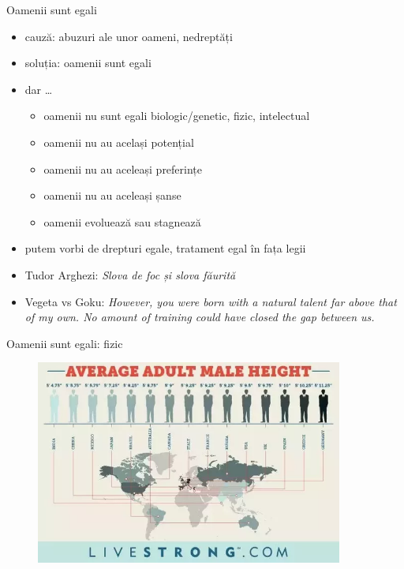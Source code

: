 \documentclass{simple}
\begin{document}
\begin{frame}{Oamenii sunt egali}
  \begin{itemize}
    \pause \item cauză: abuzuri ale unor oameni, nedreptăți
    \pause \item soluția: oamenii sunt egali
    \pause \item dar \ldots
      \begin{itemize}
        \pause \item oamenii nu sunt egali biologic/genetic, fizic, intelectual
        \pause \item oamenii nu au același potențial
        \pause \item oamenii nu au aceleași preferințe
        \pause \item oamenii nu au aceleași șanse
        \pause \item oamenii evoluează sau stagnează
      \end{itemize}
    \pause \item putem vorbi de drepturi egale, tratament egal în fața legii
    \pause \item Tudor Arghezi: \textit{Slova de foc și slova făurită}
    \pause \item Vegeta vs Goku: \textit{However, you were born with a natural talent far above that of my own. No amount of training could have closed the gap between us.}
  \end{itemize}
\end{frame}

\begin{frame}{Oamenii sunt egali: fizic}
  \centering
  \begin{figure}
    \includegraphics[width=0.9\textwidth]{img/male-height}
  \end{figure}
\end{frame}
\end{document}
